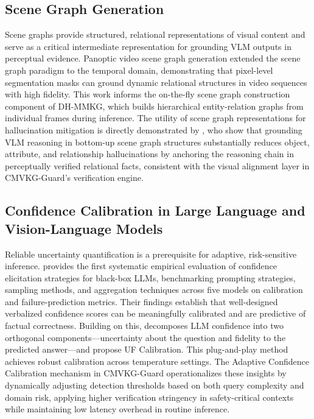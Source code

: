 \subsection{Scene Graph Generation}

Scene graphs provide structured, relational representations of visual content and serve as a critical intermediate representation for grounding VLM outputs in perceptual evidence. Panoptic video scene graph generation \citep{yang2023panoptic} extended the scene graph paradigm to the temporal domain, demonstrating that pixel-level segmentation masks can ground dynamic relational structures in video sequences with high fidelity. This work informs the on-the-fly scene graph construction component of DH-MMKG, which builds hierarchical entity-relation graphs from individual frames during inference. The utility of scene graph representations for hallucination mitigation is directly demonstrated by \citet{wu2025combating}, who show that grounding VLM reasoning in bottom-up scene graph structures substantially reduces object, attribute, and relationship hallucinations by anchoring the reasoning chain in perceptually verified relational facts, consistent with the visual alignment layer in CMVKG-Guard's verification engine.

\subsection{Confidence Calibration in Large Language and Vision-Language Models}

Reliable uncertainty quantification is a prerequisite for adaptive, risk-sensitive inference. \citet{xiong2024llms} provides the first systematic empirical evaluation of confidence elicitation strategies for black-box LLMs, benchmarking prompting strategies, sampling methods, and aggregation techniques across five models on calibration and failure-prediction metrics. Their findings establish that well-designed verbalized confidence scores can be meaningfully calibrated and are predictive of factual correctness. Building on this, \citet{zhang2024calibrating} decomposes LLM confidence into two orthogonal components—uncertainty about the question and fidelity to the predicted answer—and propose UF Calibration. This plug-and-play method achieves robust calibration across temperature settings. The Adaptive Confidence Calibration mechanism in CMVKG-Guard operationalizes these insights by dynamically adjusting detection thresholds based on both query complexity and domain risk, applying higher verification stringency in safety-critical contexts while maintaining low latency overhead in routine inference.